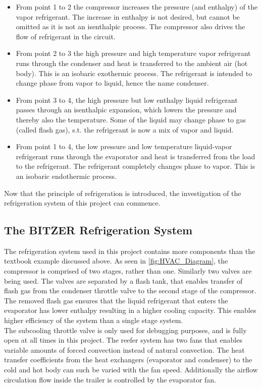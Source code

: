 \begin{itemize}
	\item From point 1 to 2 the compressor increases the pressure (and enthalpy) of the vapor refrigerant. The increase in enthalpy is not desired, but cannot be omitted as it is not an isenthalpic process. The compressor also drives the flow of refrigerant in the circuit.
	\item From point 2 to 3 the high pressure and high temperature vapor refrigerant runs through the condenser and heat is transferred to the ambient air (hot body). This is an isobaric exothermic process. The refrigerant is intended to change phase from vapor to liquid, hence the name condenser.
	\item From point 3 to 4, the high pressure but low enthalpy liquid refrigerant passes through an isenthalpic expansion, which lowers the pressure and thereby also the temperature. Some of the liquid may change phase to gas (called flash gas), s.t. the refrigerant is now a mix of vapor and liquid.
	\item From point 1 to 4, the low pressure and low temperature liquid-vapor refrigerant runs through the evaporator and heat is transferred from the load to the refrigerant. The refrigerant completely changes phase to vapor. This is an isobaric endothermic process.
\end{itemize}
 Now that the principle of refrigeration is introduced, the investigation of the refrigeration system of this project can commence.

\subsection{The BITZER Refrigeration System}
The refrigeration system used in this project contains more components than the textbook example discussed above. As seen in \cref{fig:HVAC_Diagram}, the compressor is comprised of two stages, rather than one. Similarly two valves are being used. The valves are separated by a flash tank, that enables transfer of flash gas from the condenser throttle valve to the second stage of the compressor. The removed flash gas ensures that the liquid refrigerant that enters the evaporator has lower enthalpy resulting in a higher cooling capacity. This enables higher efficiency of the system than a single stage system.\\
The subcooling throttle valve is only used for debugging purposes, and is fully open at all times in this project. The reefer system has two fans that enables variable amounts of forced convection instead of natural convection. The heat transfer coefficients from the heat exchangers (evaporator and condenser) to the cold and hot body can such be varied with the fan speed. Additionally the airflow circulation flow inside the trailer is controlled by the evaporator fan.

